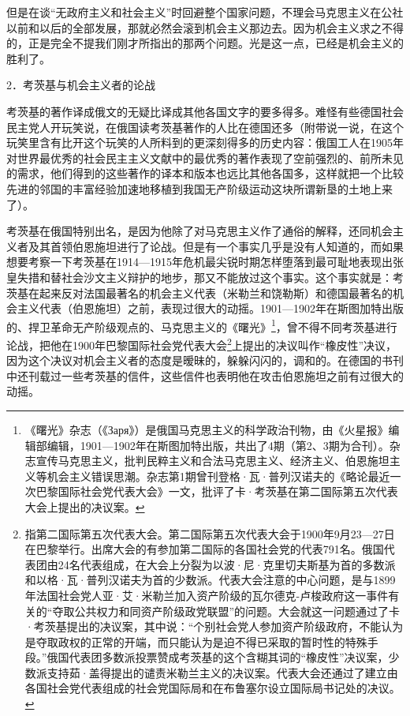 \documentclass[UTF8, 12pt, a4paper]{ctexrep}
\begin{document}
但是在谈“无政府主义和社会主义”时回避整个国家问题，不理会马克思主义在公社以前和以后的全部发展，那就必然会滚到机会主义那边去。因为机会主义求之不得的，正是完全不提我们刚才所指出的那两个问题。光是这一点，已经是机会主义的胜利了。

2．考茨基与机会主义者的论战

考茨基的著作译成俄文的无疑比译成其他各国文字的要多得多。难怪有些德国社会民主党人开玩笑说，在俄国读考茨基著作的人比在德国还多（附带说一说，在这个玩笑里含有比开这个玩笑的人所料到的更深刻得多的历史内容：俄国工人在1905年对世界最优秀的社会民主主义文献中的最优秀的著作表现了空前强烈的、前所未见的需求，他们得到的这些著作的译本和版本也远比其他各国多，这样就把一个比较先进的邻国的丰富经验加速地移植到我国无产阶级运动这块所谓新垦的土地上来了）。

考茨基在俄国特别出名，是因为他除了对马克思主义作了通俗的解释，还同机会主义者及其首领伯恩施坦进行了论战。但是有一个事实几乎是没有人知道的，而如果想要考察一下考茨基在1914—1915年危机最尖锐时期怎样堕落到最可耻地表现出张皇失措和替社会沙文主义辩护的地步，那又不能放过这个事实。这个事实就是：考茨基在起来反对法国最著名的机会主义代表（米勒兰和饶勒斯）和德国最著名的机会主义代表（伯恩施坦）之前，表现过很大的动摇。1901—1902年在斯图加特出版的、捍卫革命无产阶级观点的、马克思主义的《曙光》\footnote{《曙光》杂志（《Заря》）是俄国马克思主义的科学政治刊物，由《火星报》编辑部编辑，1901—1902年在斯图加特出版，共出了4期（第2、3期为合刊）。杂志宣传马克思主义，批判民粹主义和合法马克思主义、经济主义、伯恩施坦主义等机会主义错误思潮。杂志第1期曾刊登格·瓦·普列汉诺夫的《略论最近一次巴黎国际社会党代表大会》一文，批评了卡·考茨基在第二国际第五次代表大会上提出的决议案。}，曾不得不同考茨基进行论战，把他在1900年巴黎国际社会党代表大会\footnote{指第二国际第五次代表大会。第二国际第五次代表大会于1900年9月23—27日在巴黎举行。出席大会的有参加第二国际的各国社会党的代表791名。俄国代表团由24名代表组成，在大会上分裂为以波·尼·克里切夫斯基为首的多数派和以格·瓦·普列汉诺夫为首的少数派。代表大会注意的中心问题，是与1899年法国社会党人亚·艾·米勒兰加入资产阶级的瓦尔德克-卢梭政府这一事件有关的“夺取公共权力和同资产阶级政党联盟”的问题。大会就这一问题通过了卡·考茨基提出的决议案，其中说：“个别社会党人参加资产阶级政府，不能认为是夺取政权的正常的开端，而只能认为是迫不得已采取的暂时性的特殊手段。”俄国代表团多数派投票赞成考茨基的这个含糊其词的“橡皮性”决议案，少数派支持茹·盖得提出的谴责米勒兰主义的决议案。代表大会还通过了建立由各国社会党代表组成的社会党国际局和在布鲁塞尔设立国际局书记处的决议。}上提出的决议叫作“橡皮性”决议，因为这个决议对机会主义者的态度是暧昧的，躲躲闪闪的，调和的。在德国的书刊中还刊载过一些考茨基的信件，这些信件也表明他在攻击伯恩施坦之前有过很大的动摇。
\end{document}
